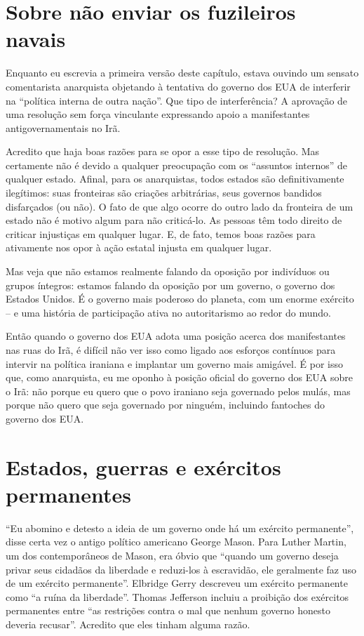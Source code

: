 \section{Sobre não enviar os fuzileiros navais}

Enquanto eu escrevia a primeira versão deste capítulo, estava ouvindo um sensato comentarista anarquista objetando à tentativa do governo dos EUA de interferir na ``política interna de outra nação''. Que tipo de interferência? A aprovação de uma resolução sem força vinculante expressando apoio a manifestantes antigovernamentais no Irã.

Acredito que haja boas razões para se opor a esse tipo de resolução. Mas certamente não é devido a qualquer preocupação com os ``assuntos internos'' de qualquer estado. Afinal, para os anarquistas, todos estados são definitivamente ilegítimos: suas fronteiras são criações arbitrárias, seus governos bandidos disfarçados (ou não). O fato de que algo ocorre do outro lado da fronteira de um estado não é motivo algum para não criticá-lo. As pessoas têm todo direito de criticar injustiças em qualquer lugar. E, de fato, temos boas razões para ativamente nos opor à ação estatal injusta em qualquer lugar.

Mas veja que não estamos realmente falando da oposição por indivíduos ou grupos íntegros: estamos falando da oposição por um governo, o governo dos Estados Unidos. É o governo mais poderoso do planeta, com um enorme exército -- e uma história de participação ativa no autoritarismo ao redor do mundo. 

Então quando o governo dos EUA adota uma posição acerca dos manifestantes nas ruas do Irã, é difícil não ver isso como ligado aos esforços contínuos para intervir na política iraniana e implantar um governo mais amigável. É por isso que, como anarquista, eu me oponho à posição oficial do governo dos EUA sobre o Irã: não porque eu quero que o povo iraniano seja governado pelos mulás, mas porque não quero que seja governado por ninguém, incluindo fantoches do governo dos EUA.

\section{Estados, guerras e exércitos permanentes}

``Eu abomino e detesto a ideia de um governo onde há um exército permanente'', disse certa vez o antigo político americano George Mason. Para Luther Martin, um dos contemporâneos de Mason, era óbvio que ``quando um governo deseja privar seus cidadãos da liberdade e reduzi-los à escravidão, ele geralmente faz uso de um exército permanente''. Elbridge Gerry descreveu um exército permanente como ``a ruína da liberdade''. Thomas Jefferson incluiu a proibição dos exércitos permanentes entre ``as restrições contra o mal que nenhum governo honesto deveria recusar''. Acredito que eles tinham alguma razão.

